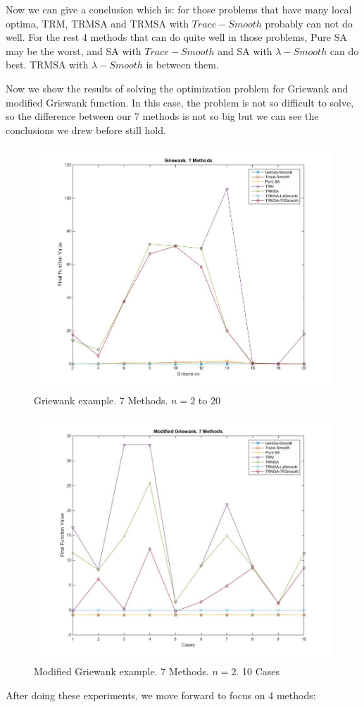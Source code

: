 \documentclass[letterpaper,12pt,titlepage,oneside,final]{book}
\begin{document}
Now we can give a conclusion which is: for those problems that have many local optima, TRM, TRMSA and TRMSA with $Trace-Smooth$ probably can not do well. For the rest 4 methods that can do quite well in those problems, Pure SA may be the worst, and SA with $Trace-Smooth$ and SA with $\lambda-Smooth$ can do best. TRMSA with $\lambda-Smooth$ is between them.

Now we show the results of solving the optimization problem for Griewank and modified Griewank function. In this case, the problem is not so difficult to solve, so the difference between our 7 methods is not so big but we can see the conclusions we drew before still hold.

\begin{figure}[H]
\includegraphics[scale=0.5]{griewank7methods.jpg}
\caption{Griewank example. 7 Methods. $n=2$ to $20$}
\end{figure}

\begin{figure}[H]
\includegraphics[scale=0.5]{griewank27methods.jpg}
\caption{Modified Griewank example. 7 Methods. $n=2$. 10 Cases}
\end{figure}
After doing these experiments, we move forward to focus on 4 methods: 
\end{document}

